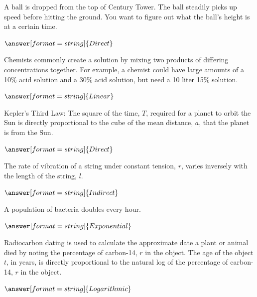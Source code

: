 \documentclass{ximera}
\begin{document}
\begin{question}
A ball is dropped from the top of Century Tower. The ball steadily picks up speed before hitting the ground. You want to figure out what the ball's height is at a certain time.

$\answer[format=string]{Direct}$

\end{question}


\begin{question}
Chemists commonly create a solution by mixing two products of differing concentrations together. For example, a chemist could have large amounts of a 10\% acid solution and a 30\% acid solution, but need a 10 liter 15\% solution. 

$\answer[format=string]{Linear}$

\end{question}

\begin{question}
[Astronomy] Kepler's Third Law: The square of the time, $T$, required for a planet to orbit the Sun is directly proportional to the cube of the mean distance, $a$, that the planet is from the Sun. 

$\answer[format=string]{Direct}$

\end{question}

\begin{question}
[Physics] The rate of vibration of a string under constant tension, $r$, varies inversely with the length of the string, $l$.

$\answer[format=string]{Indirect}$

\end{question}


\begin{question}
A population of bacteria doubles every hour. 

$\answer[format=string]{Exponential}$

\end{question}

\begin{question}
[Anthropology] Radiocarbon dating is used to calculate the approximate date a plant or animal died by noting the percentage of carbon-14, $r$ in the object. The age of the object $t$, in years, is directly proportional to the natural log of the percentage of carbon-14, $r$ in the object. 

$\answer[format=string]{Logarithmic}$

\end{question}
\end{document}
